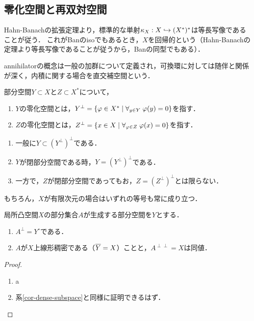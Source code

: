 \documentclass[uplatex,dvipdfmx]{jsreport}
\begin{document}
\subsection{零化空間と再双対空間}

\begin{tcolorbox}[colframe=ForestGreen, colback=ForestGreen!10!white,breakable,colbacktitle=ForestGreen!40!white,coltitle=black,fonttitle=\bfseries\sffamily,
title=]
    Hahn-Banachの拡張定理より，標準的な単射$\kappa_X:X\hookrightarrow (X^*)^*$は等長写像であることが従う．
    これがBanのisoでもあるとき，$X$を回帰的という（Hahn-Banachの定理より等長写像であることが従うから，Banの同型でもある）．

    annihilatorの概念は一般の加群について定義され，可換環に対しては随伴と関係が深く，内積に関する場合を直交補空間という．
\end{tcolorbox}

\begin{definition}[annihilator]
    部分空間$Y\subset X$と$Z\subset X^*$について，
    \begin{enumerate}
        \item $Y$の零化空間とは，$Y^\perp=\left\{\varphi\in X^*\mid\forall_{y\in Y}\;\varphi(y)=0\right\}$を指す．
        \item $Z$の零化空間とは，$Z^\perp=\left\{x\in X\mid\forall_{\varphi\in Z}\;\varphi(x)=0\right\}$を指す．
    \end{enumerate}
\end{definition}

\begin{lemma}\mbox{}
    \begin{enumerate}
        \item 一般に$Y\subset(Y^\perp)^\perp$である．
        \item $Y$が閉部分空間である時，$Y=(Y^\perp)^\perp$である．
        \item 一方で，$Z$が閉部分空間であってもお，$Z=(Z^\perp)^\perp$とは限らない．
    \end{enumerate}
    もちろん，$X$が有限次元の場合はいずれの等号も常に成り立つ．
\end{lemma}

\begin{proposition}\label{prop-dense-subspace-of-Banach-space}
    局所凸空間$X$の部分集合$A$が生成する部分空間を$Y$とする．
    \begin{enumerate}
        \item $A^\perp=Y^\circ$である．
        \item $A$が$X$上線形稠密である（$\overline{Y}=X$）ことと，$A^{\perp\perp}=X$は同値．
    \end{enumerate}
\end{proposition}
\begin{proof}\mbox{}
    \begin{enumerate}
        \item a
        \item 系\ref{cor-dense-subspace}と同様に証明できるはず．
    \end{enumerate}
\end{proof}
\end{document}
